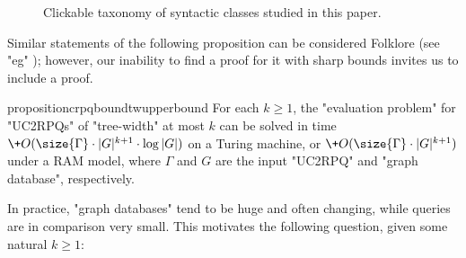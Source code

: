 \begin{figure}
	\centering
	\caption{
		\AP\label{fig:taonomy-syntactic}
		Clickable taxonomy of syntactic classes studied in this paper.
	}
\end{figure}

Similar statements of the following proposition can be considered Folklore (see "eg" {\cite[Theorem IV.3]{RomeroBarceloVardi2017Homomorphism}}); however, our inability to find a proof for it with sharp bounds invites us to include a proof.
\begin{restatable}{proposition}{crpqboundtwupperbound}
	\AP\label{prop:crpq-bound-tree-width-upper-bound}
    For each $k \geq 1$, the "evaluation problem" for "UC2RPQs" of "tree-width" at
    most $k$ can be solved in time $\+O(\size{\Gamma} \cdot |G|^{k+1} \cdot \log{|G|})$ on a Turing machine,
	or $\+O(\size{\Gamma} \cdot |G|^{k+1})$ under a RAM model, where $\Gamma$ and $G$ are the input "UC2RPQ" and "graph database", respectively.
\end{restatable}



In practice, "graph databases" tend to be huge and often changing, while queries
are in comparison very small.
This motivates the following question, given some natural $k \geq 1$: 

